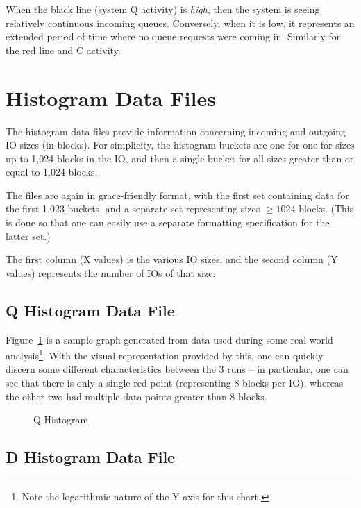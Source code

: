 \documentclass{article}
\begin{document}
  When the black line (system Q activity) is \emph{high}, then the system
  is seeing relatively continuous incoming queues. Conversely, when it is
  low, it represents an extended period of time where no queue requests
  were coming in. Similarly for the red line and C activity.

\newpage\section{\label{sec:hist}Histogram Data Files}

  The histogram data files provide information concerning incoming and
  outgoing IO sizes (in blocks). For simplicity, the histogram buckets
  are one-for-one for sizes up to 1,024 blocks in the IO, and then a
  single bucket for all sizes greater than or equal to 1,024 blocks.

  The files are again in grace-friendly format, with the first set
  containing data for the first 1,023 buckets, and a separate set
  representing sizes $\ge 1024$ blocks. (This is done so that one can
  easily use a separate formatting specification for the latter set.)

  The first column (X values) is the various IO sizes, and the second
  column (Y values) represents the number of IOs of that size.

\subsection*{\label{sec:qhist}Q Histogram Data File}

  Figure~\ref{fig:qhist} is a sample graph generated from data used during
  some real-world analysis\footnote{Note the logarithmic nature of the
  Y axis for this chart.}. With the visual representation provided by
  this, one can quickly discern some different characteristics between
  the 3 runs -- in particular, one can see that there is only a single
  red point (representing 8 blocks per IO), whereas the other two had
  multiple data points greater than 8 blocks.

  \begin{figure}[hb]
  \leavevmode\centering
  \caption{\label{fig:qhist}Q Histogram}
  \end{figure}

\subsection*{\label{sec:dhist}D Histogram Data File}
\end{document}
